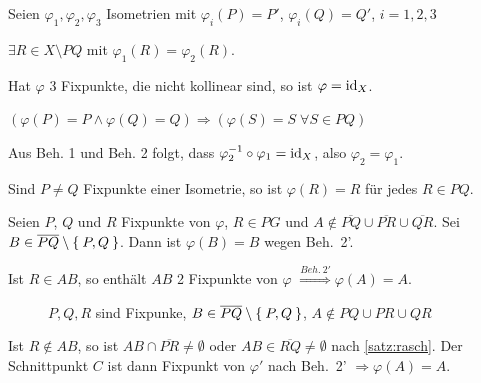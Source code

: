 \begin{beweis}
    Seien $\varphi_1, \varphi_2, \varphi_3$ Isometrien mit
    $\varphi_i(P) = P'$, $\varphi_i(Q) = Q'$, $i=1,2,3$

    \begin{behauptung}[1]
        $\exists R \in X \setminus PQ$ mit $\varphi_{1} (R) = \varphi_{2} (R)$.
    \end{behauptung}
    \begin{behauptung}[2]
        Hat $\varphi$ 3 Fixpunkte, die nicht kollinear sind,
        so ist $\varphi = \textnormal{id}_X$.
    \end{behauptung}

    \begin{behauptung}[2']
        $(\varphi(P) = P \land \varphi(Q) = Q) \Rightarrow (\varphi(S) = S\;\forall S \in PQ)$
    \end{behauptung}

    Aus Beh. 1 und Beh. 2 folgt, dass $\varphi_2^{-1} \circ \varphi_1 = \textnormal{id}_X$,
    also $\varphi_2 = \varphi_1$.

    \begin{beweis}\leavevmode
        \begin{behauptung}
            Sind $P \neq Q$ Fixpunkte einer Isometrie, so ist 
            $\varphi(R) = R$ für jedes $R \in PQ$.
        \end{behauptung}
        \begin{beweis}
            Seien $P$, $Q$ und $R$ Fixpunkte von $\varphi$, $R \in PG$
            und $A \notin \overline{PQ} \cup \overline{PR} \cup \overline{QR}$.
            Sei $B \in \overline{PQ} \setminus \Set{P, Q}$. Dann ist
            $\varphi(B) = B$ wegen Beh.~2'.

            Ist $R \in AB$, so enthält $AB$ 2 Fixpunkte von $\varphi$
            $\stackrel{Beh.~2'}{\Rightarrow} \varphi(A) = A$.

            \begin{figure}[H]
                \centering
                
                \caption{$P, Q, R$ sind Fixpunke, $B \in \overline{PQ} \setminus \Set{P,Q}$, $A \notin PQ \cup PR \cup QR$}
                \label{fig:geometry-1}
            \end{figure}

            Ist $R \notin AB$, so ist $AB \cap \overline{PR} \neq \emptyset$
            oder $AB \in \overline{RQ} \neq \emptyset$ nach \cref{satz:rasch}.
            Der Schnittpunkt $C$ ist dann Fixpunkt von $\varphi'$
            nach Beh.~2' $\Rightarrow \varphi(A) = A$.
        \end{beweis}


\end{beweis}
\end{beweis}
